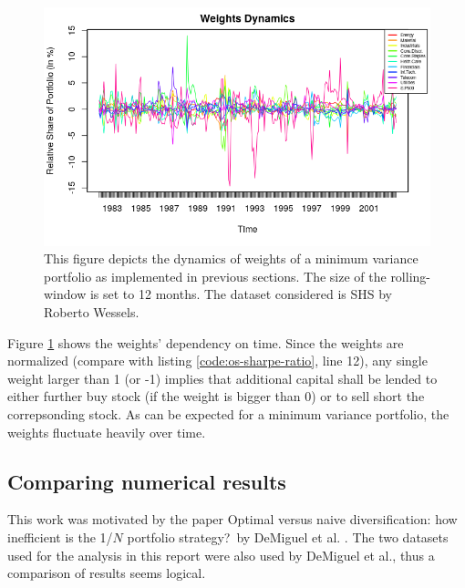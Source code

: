 \begin{figure}[h]
  \begin{center}
    \includegraphics[width=\textwidth]{Bilder/dynamics-of-weights.png}
    \caption{This figure depicts the dynamics of weights of a minimum variance portfolio as implemented in previous sections. The size of the rolling-window is set to 12 months. The dataset considered is SHS by Roberto Wessels.}
    \label{fig:dynamics_of_weights}
  \end{center}
\end{figure}

Figure \ref{fig:dynamics_of_weights} shows the weights' dependency on time. Since the weights are normalized (compare with listing \ref{code:os-sharpe-ratio}, line 12), any single weight larger than 1 (or -1) implies that additional capital shall be lended to either further buy stock (if the weight is bigger than 0) or to sell short the correpsonding stock. As can be expected for a minimum variance portfolio, the weights fluctuate heavily over time.\\

\subsection{Comparing numerical results}
This work was motivated by the paper \glqq Optimal versus naive diversification: how inefficient is the 1/$N$ portfolio strategy?\grqq~by DeMiguel et al. \cite{DEM09}. The two datasets used for the analysis in this report were also used by DeMiguel et al., thus a comparison of results seems logical.\\

